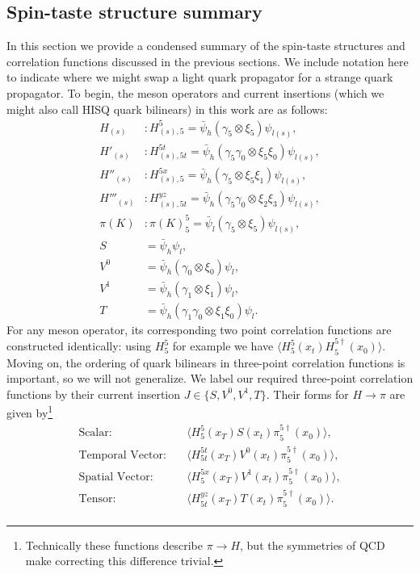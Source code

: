 \subsection{Spin-taste structure summary}
In this section we provide a condensed summary of the spin-taste structures and correlation functions discussed in the previous sections.  We include notation here to indicate where we might swap a light quark propagator for a strange quark propagator. To begin, the meson operators and current insertions (which we might also call HISQ quark bilinears) in this work are as follows:
    \begin{equation}\label{eq:correlator_spin-taste}
    \begin{split}
        H_{(s)} &: H^5_{(s),5} = \bar{\psi}_h(\gamma_5 \otimes\xi_5)\psi_{l(s)},\\
        H'_{(s)} &: H^{5t}_{(s),5t} = \bar{\psi}_h(\gamma_5 \gamma_0\otimes\xi_5\xi_0)\psi_{l(s)},\\
        H''_{(s)} &: H^{5x}_{(s),5} = \bar{\psi}_h(\gamma_5 \otimes\xi_5\xi_1)\psi_{l(s)},\\
        H'''_{(s)} &: H^{yz}_{(s),5t}= \bar{\psi}_h(\gamma_5 \gamma_0\otimes\xi_2\xi_3)\psi_{l(s)},\\
        \pi(K) &: \pi(K)^5_5 = \bar{\psi}_l(\gamma_5\otimes\xi_5)\psi_{l(s)},\\
        S &= \bar{\psi}_h\psi_{l},\\
        V^0 &= \bar{\psi}_h(\gamma_0 \otimes\xi_0)\psi_{l},\\
        V^1 &= \bar{\psi}_h(\gamma_1 \otimes\xi_1)\psi_{l},\\
        T &= \bar{\psi}_h(\gamma_1\gamma_0 \otimes \xi_1\xi_0)\psi_{l}.
    \end{split}
    \end{equation}
For any meson operator, its corresponding two point correlation functions are constructed identically: using $H^5_5$ for example we have $\langle H^5_5(x_t)H^{5\dagger}_5(x_0)\rangle$.  Moving on, the ordering of quark bilinears in three-point correlation functions is important, so we will not generalize.  We label our required three-point correlation functions by their current insertion $J\in\{S,V^0,V^1,T\}$.  Their forms for $H \rightarrow \pi$ are given by\footnote{Technically these functions describe $\pi \rightarrow H$, but the symmetries of QCD make correcting this difference trivial.}
\begin{equation}\label{eq:spin-taste_3pt_function_construction}
    \begin{split}
        \text{Scalar:}&\quad  \langle H^5_5(x_T)S(x_t)\pi^{5\dagger}_5(x_0)\rangle,\\
        \text{Temporal Vector:}&\quad \langle H^{5t}_{5t}(x_T)V^{0}(x_t)\pi^{5\dagger}_5(x_0)\rangle,\\
        \text{Spatial Vector:}&\quad \langle H^{5x}_{5}(x_T)V^{1}(x_t)\pi^{5\dagger}_5(x_0)\rangle,\\
        \text{Tensor:}&\quad \langle H^{yz}_{5t}(x_T)T(x_t)\pi^{5\dagger}_5(x_0) \rangle.\\
    \end{split}
\end{equation}
